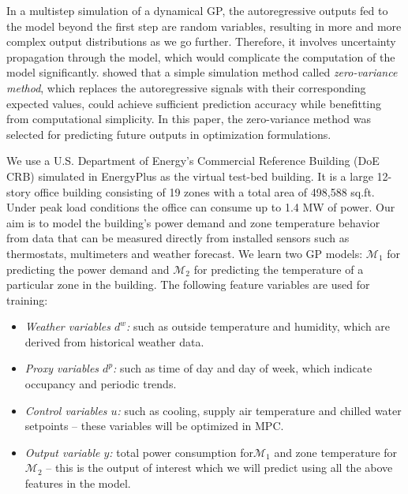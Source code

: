 In a multistep simulation of a dynamical GP, the autoregressive outputs fed to the model beyond the first step are random variables, resulting in more and more complex output distributions as we go further.
Therefore, it involves uncertainty propagation through the model, which would complicate the computation of the model significantly.
\cite{nghiemetal16gp} showed that a simple simulation method called \emph{zero-variance method}, which replaces the autoregressive signals with their corresponding expected values, could achieve sufficient prediction accuracy while benefitting from computational simplicity.
In this paper, the zero-variance method was selected for predicting future outputs in optimization formulations.

We use a U.S. Department of Energy’s Commercial Reference Building (DoE CRB) simulated in EnergyPlus as the virtual test-bed building. It is a large 12-story office building consisting of 19 zones with a total area of 498,588 sq.ft. Under peak load conditions the office can consume up to 1.4 MW of power.
Our aim is to model the building's power demand and zone temperature behavior from data that can be measured directly from installed sensors such as thermostats, multimeters and weather forecast.
We learn two GP models: \(\mathcal{M}_1\) for predicting the power demand and \(\mathcal{M}_2\) for predicting the temperature of a particular zone in the building.
The following feature variables are used for training:
\begin{itemize}
\item \textit{Weather variables \(d^w\):} such as outside temperature and humidity, which are derived from historical weather data.
\item \textit{Proxy variables \(d^p\):} such as time of day and day of week, which indicate occupancy and periodic trends.
\item \textit{Control variables \(u\):} such as cooling, supply air temperature and chilled water setpoints -- these variables will be optimized in MPC.
\item \textit{Output variable \(y\):} total power consumption for\(\mathcal{M}_1\) and zone temperature for \(\mathcal{M}_2\) -- this is the output of interest which we will predict using all the above features in the model.
\end{itemize}

